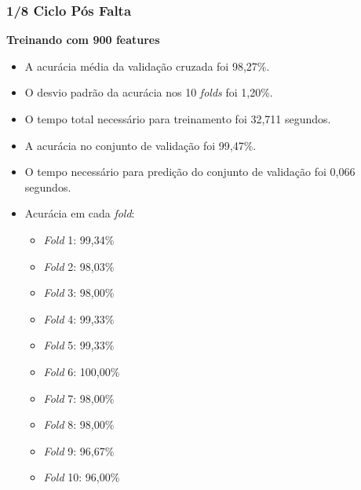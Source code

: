 \subsubsection{1/8 Ciclo Pós Falta}
\textbf{Treinando com 900 features}
\begin{itemize}
    \item A acurácia média da validação cruzada foi 98,27\%.
    \item O desvio padrão da acurácia nos 10 \textit{folds} foi 1,20\%.
    \item O tempo total necessário para treinamento foi 32,711 segundos.
    \item A acurácia no conjunto de validação foi 99,47\%.
    \item O tempo necessário para predição do conjunto de validação foi 0,066 segundos.
    \item Acurácia em cada \textit{fold}:
    \begin{itemize}
        \item \textit{Fold} 1: 99,34\%
        \item \textit{Fold} 2: 98,03\%
        \item \textit{Fold} 3: 98,00\%
        \item \textit{Fold} 4: 99,33\%
        \item \textit{Fold} 5: 99,33\%
        \item \textit{Fold} 6: 100,00\%
        \item \textit{Fold} 7: 98,00\%
        \item \textit{Fold} 8: 98,00\%
        \item \textit{Fold} 9: 96,67\%
        \item \textit{Fold} 10: 96,00\%
    \end{itemize}
\end{itemize}

